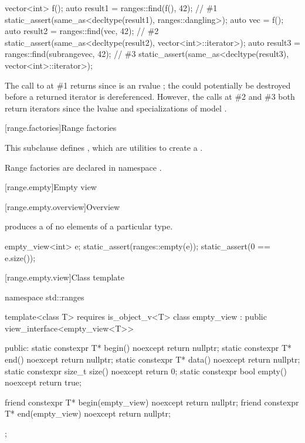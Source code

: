\pnum
\begin{example}
\begin{codeblock}
vector<int> f();
auto result1 = ranges::find(f(), 42);                                   // \#1
static_assert(same_as<decltype(result1), ranges::dangling>);
auto vec = f();
auto result2 = ranges::find(vec, 42);                                   // \#2
static_assert(same_as<decltype(result2), vector<int>::iterator>);
auto result3 = ranges::find(subrange{vec}, 42);                         // \#3
static_assert(same_as<decltype(result3), vector<int>::iterator>);
\end{codeblock}
The call to  at \#1 returns 
since  is an rvalue ;
the  could potentially be destroyed
before a returned iterator is dereferenced.
However, the calls at \#2 and \#3 both return iterators
since the lvalue  and specializations of 
model .
\end{example}

[range.factories]{Range factories}

\pnum
This subclause defines ,
which are utilities to create a .

\pnum
Range factories are declared in namespace .

[range.empty]{Empty view}

[range.empty.overview]{Overview}

\pnum
{} produces a  of no elements of
a particular type.

\pnum
\begin{example}
\begin{codeblock}
empty_view<int> e;
static_assert(ranges::empty(e));
static_assert(0 == e.size());
\end{codeblock}
\end{example}

[range.empty.view]{Class template }

\begin{codeblock}
namespace std::ranges {
  template<class T>
    requires is_object_v<T>
  class empty_view : public view_interface<empty_view<T>> {
  public:
    static constexpr T* begin() noexcept { return nullptr; }
    static constexpr T* end() noexcept { return nullptr; }
    static constexpr T* data() noexcept { return nullptr; }
    static constexpr size_t size() noexcept { return 0; }
    static constexpr bool empty() noexcept { return true; }

    friend constexpr T* begin(empty_view) noexcept { return nullptr; }
    friend constexpr T* end(empty_view) noexcept { return nullptr; }
  };
}
\end{codeblock}

